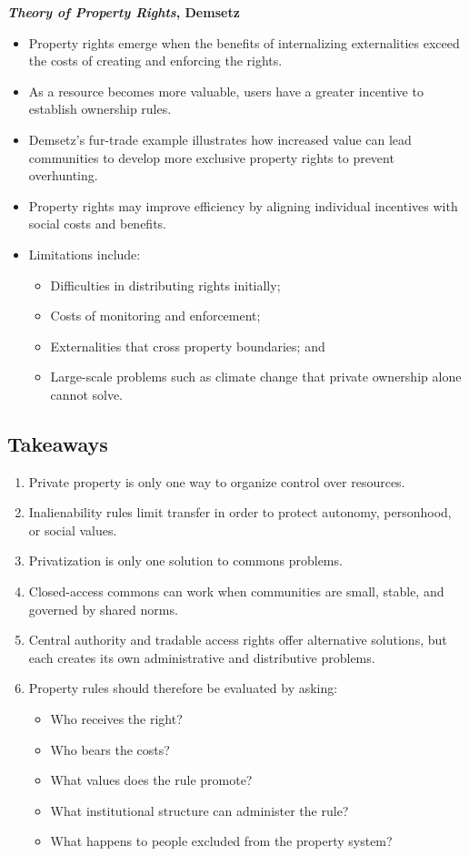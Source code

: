 \documentclass[11pt]{tex/lawoutline}
\begin{document}
\textbf{\textit{Theory of Property Rights}, Demsetz}{
\begin{itemize}
    \item Property rights emerge when the benefits of internalizing externalities exceed the costs of creating and enforcing the rights.
    \item As a resource becomes more valuable, users have a greater incentive to establish ownership rules.
    \item Demsetz's fur-trade example illustrates how increased value can lead communities to develop more exclusive property rights to prevent overhunting.
    \item Property rights may improve efficiency by aligning individual incentives with social costs and benefits.
    \item Limitations include:
    \begin{itemize}
        \item Difficulties in distributing rights initially;
        \item Costs of monitoring and enforcement;
        \item Externalities that cross property boundaries; and
        \item Large-scale problems such as climate change that private ownership alone cannot solve.
    \end{itemize}
\end{itemize}
}

\subsection{Takeaways}{
\begin{enumerate}
    \item Private property is only one way to organize control over resources.
    \item Inalienability rules limit transfer in order to protect autonomy, personhood, or social values.
    \item Privatization is only one solution to commons problems.
    \item Closed-access commons can work when communities are small, stable, and governed by shared norms.
    \item Central authority and tradable access rights offer alternative solutions, but each creates its own administrative and distributive problems.
    \item Property rules should therefore be evaluated by asking:
    \begin{itemize}
        \item Who receives the right?
        \item Who bears the costs?
        \item What values does the rule promote?
        \item What institutional structure can administer the rule?
        \item What happens to people excluded from the property system?
    \end{itemize}
\end{enumerate}
}
\end{document}
